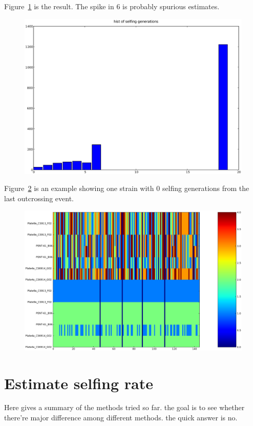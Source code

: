 \documentclass[a4paper,10pt]{article}
\begin{document}
Figure~\ref{f8} is the result. The spike in 6 is probably spurious estimates.

\begin{figure}
\includegraphics[width=1\textwidth]{figures/justin_data_y_b_filtered_estimate_selfing_generation_hist.eps}
\caption{}\label{f8}
\end{figure}

Figure~\ref{f9} is an example showing one strain with 0 selfing generations from the last outcrossing event.

\begin{figure}
\includegraphics[width=1\textwidth]{figures/trio1.eps}
\caption{}\label{f9}
\end{figure}

\section{Estimate selfing rate}
Here gives a summary of the methods tried so far. the goal is to see whether there're major difference among different methods. the quick answer is no.
\end{document}
